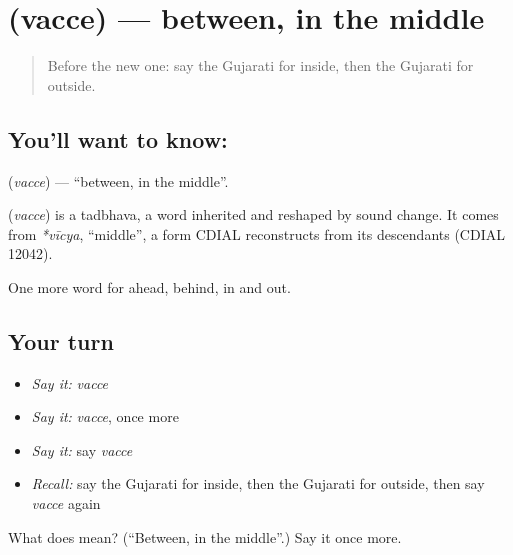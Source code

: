\section[\texorpdfstring{\gu{વચ્ચે} (vacce)}{વચ્ચે (vacce)}]{ (vacce) — between, in the middle}

\label{lesson:GU-C75-between}



\begin{quote}
Before the new one: say the Gujarati for inside, then the Gujarati for outside.
\end{quote}

\subsection*{You'll want to know: }
\textbf{} (\emph{vacce}) — \textquotedblleft{}between, in the middle\textquotedblright{}.

\begin{cousinweb}
\textbf{} (\emph{vacce}) is a tadbhava, a word inherited and reshaped by sound change. It comes from \emph{*vīcya}, \textquotedblleft{}middle\textquotedblright{}, a form CDIAL reconstructs from its descendants (CDIAL 12042).
\end{cousinweb}

\begin{grammarlens}[title={What you've built}]
One more word for ahead, behind, in and out.
\end{grammarlens}

\subsection*{Your turn}
\begin{itemize}
\raggedright
  \item \emph{Say it:} \emph{vacce}
  \item \emph{Say it:} \emph{vacce}, once more
  \item \emph{Say it:} say \emph{vacce}
  \item \emph{Recall:} say the Gujarati for inside, then the Gujarati for outside, then say \emph{vacce} again
\end{itemize}

\begin{tcolorbox}[breakable,colback=teal!4,colframe=teal!35!black,title={Before you move on}]
What does  mean? (\textquotedblleft{}Between, in the middle\textquotedblright{}.) Say it once more.
\end{tcolorbox}
